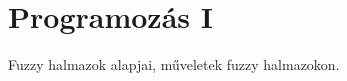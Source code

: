 \documentclass[../../main.tex]{subfiles}
\begin{document}
\section{Programozás I}

\begin{fulltheorem}
	Fuzzy halmazok alapjai, műveletek fuzzy halmazokon.
\end{fulltheorem}
\end{document}
